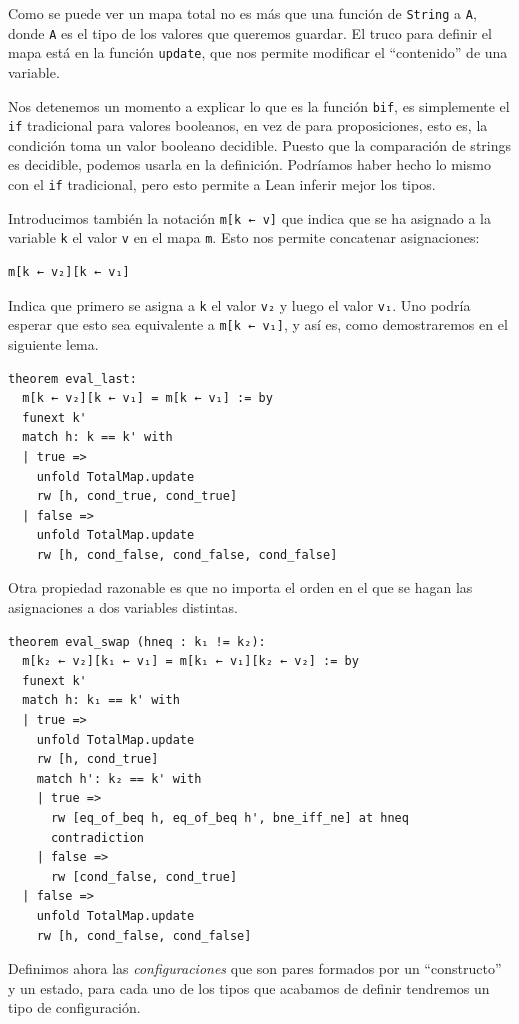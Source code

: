 \documentclass[../main.tex]{subfiles}
\begin{document}
Como se puede ver un mapa total no es más que una función de \texttt{String} a \texttt{A},
donde \texttt{A} es el tipo de los valores que queremos guardar. El truco para
definir el mapa está en la función \texttt{update}, que nos permite modificar
el \enquote{contenido} de una variable.

Nos detenemos un momento a explicar lo que es la función \texttt{bif}, 
es simplemente el \texttt{if} tradicional para valores booleanos, en vez
de para proposiciones, esto es, la condición toma un valor booleano decidible.
Puesto que la comparación de strings es decidible, podemos usarla en la definición.
Podríamos haber hecho lo mismo con el \texttt{if} tradicional, pero esto permite
a Lean inferir mejor los tipos.

Introducimos también la notación \texttt{m[k ← v]} que indica que se ha
asignado a la variable \texttt{k} el valor \texttt{v} en el mapa \texttt{m}.
Esto nos permite concatenar asignaciones:

\begin{verbatim}
m[k ← v₂][k ← v₁]
\end{verbatim}

Indica que primero se asigna a \texttt{k} el valor \texttt{v₂} y luego el valor \texttt{v₁}.
Uno podría esperar que esto sea equivalente a \texttt{m[k ← v₁]}, y así es,
como demostraremos en el siguiente lema.

\begin{verbatim}
theorem eval_last:
  m[k ← v₂][k ← v₁] = m[k ← v₁] := by
  funext k'
  match h: k == k' with
  | true =>
    unfold TotalMap.update
    rw [h, cond_true, cond_true]
  | false =>
    unfold TotalMap.update
    rw [h, cond_false, cond_false, cond_false]
\end{verbatim}

Otra propiedad razonable es que no importa el orden en el que se hagan las asignaciones
a dos variables distintas.

\begin{verbatim}
theorem eval_swap (hneq : k₁ != k₂):
  m[k₂ ← v₂][k₁ ← v₁] = m[k₁ ← v₁][k₂ ← v₂] := by
  funext k'
  match h: k₁ == k' with
  | true =>
    unfold TotalMap.update
    rw [h, cond_true]
    match h': k₂ == k' with
    | true =>
      rw [eq_of_beq h, eq_of_beq h', bne_iff_ne] at hneq
      contradiction
    | false =>
      rw [cond_false, cond_true]
  | false =>
    unfold TotalMap.update
    rw [h, cond_false, cond_false]
\end{verbatim}

Definimos ahora las \emph{configuraciones} que son pares formados por un 
\enquote{constructo} y un estado, para cada uno
de los tipos que acabamos de definir tendremos un tipo de configuración.
\end{document}

